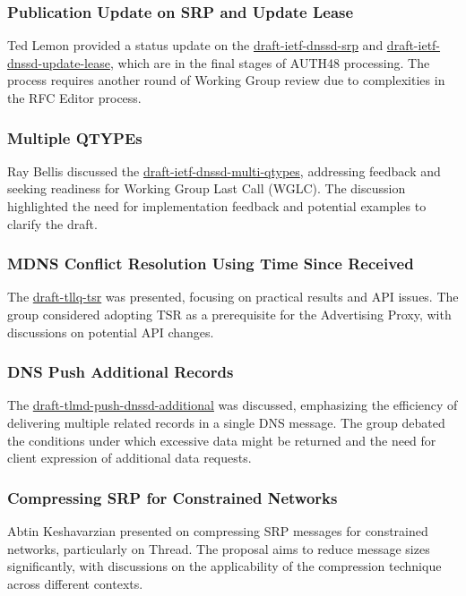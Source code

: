 \documentclass{article}
\begin{document}
\subsubsection{Publication Update on SRP and Update Lease}
Ted Lemon provided a status update on the \href{https://datatracker.ietf.org/doc/draft-ietf-dnssd-srp/}{draft-ietf-dnssd-srp} and \href{https://datatracker.ietf.org/doc/draft-ietf-dnssd-update-lease/}{draft-ietf-dnssd-update-lease}, which are in the final stages of AUTH48 processing. The process requires another round of Working Group review due to complexities in the RFC Editor process.

\subsubsection{Multiple QTYPEs}
Ray Bellis discussed the \href{https://datatracker.ietf.org/doc/draft-ietf-dnssd-multi-qtypes/}{draft-ietf-dnssd-multi-qtypes}, addressing feedback and seeking readiness for Working Group Last Call (WGLC). The discussion highlighted the need for implementation feedback and potential examples to clarify the draft.

\subsubsection{MDNS Conflict Resolution Using Time Since Received}
The \href{https://datatracker.ietf.org/doc/draft-tllq-tsr/}{draft-tllq-tsr} was presented, focusing on practical results and API issues. The group considered adopting TSR as a prerequisite for the Advertising Proxy, with discussions on potential API changes.
\subsubsection{DNS Push Additional Records}
The \href{https://datatracker.ietf.org/doc/draft-tlmd-push-dnssd-additional/}{draft-tlmd-push-dnssd-additional} was discussed, emphasizing the efficiency of delivering multiple related records in a single DNS message. The group debated the conditions under which excessive data might be returned and the need for client expression of additional data requests.

\subsubsection{Compressing SRP for Constrained Networks}
Abtin Keshavarzian presented on compressing SRP messages for constrained networks, particularly on Thread. The proposal aims to reduce message sizes significantly, with discussions on the applicability of the compression technique across different contexts.
\end{document}

